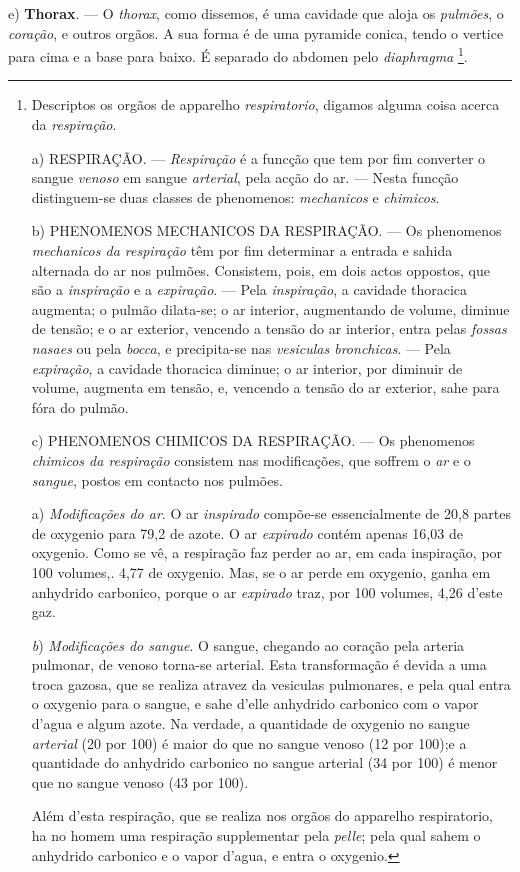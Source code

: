 e) \textbf{Thorax}. --- O \emph{thorax}, como dissemos, é uma cavidade que aloja os \emph{pulmões}, o \emph{coração}, e outros orgãos. A sua forma é de uma pyramide conica, tendo o vertice para cima e a base para baixo. É separado do abdomen pelo \emph{diaphragma} \footnote{Descriptos os orgãos de apparelho \emph{respiratorio}, digamos alguma coisa acerca da \emph{respiração}.\par a) \textsc{RESPIRAÇÃO}. --- \emph{Respiração} é a funcção que tem por fim converter o sangue \emph{venoso} em sangue \emph{arterial}, pela acção do ar. --- Nesta funcção distinguem-se duas classes de phenomenos: \emph{mechanicos} e \emph{chimicos}.\par b) PHENOMENOS MECHANICOS DA RESPIRAÇÃO. --- Os phenomenos \emph{mechanicos da respiração} têm por fim determinar a entrada e sahida alternada do ar nos pulmões. Consistem, pois, em dois actos oppostos, que são a \emph{inspiração} e a \emph{expiração}. --- Pela \emph{inspiração}, a cavidade thoracica augmenta; o pulmão dilata-se; o ar interior, augmentando de volume, diminue de tensão; e o ar exterior, vencendo a tensão do ar interior, entra pelas \emph{fossas nasaes} ou pela \emph{bocca}, e precipita-se nas \emph{vesiculas bronchicas}. --- Pela \emph{expiração}, a cavidade thoracica diminue; o ar interior, por diminuir de volume, augmenta em tensão, e, vencendo a tensão do ar exterior, sahe para fóra do pulmão.\par c) PHENOMENOS CHIMICOS DA RESPIRAÇÃO. --- Os phenomenos \emph{chimicos da respiração} consistem nas modificações, que soffrem o \emph{ar} e o \emph{sangue}, postos em contacto nos pulmões.\par a) \emph{Modificações do ar}. O ar \emph{inspirado} compõe-se essencialmente de 20,8 partes de oxygenio para 79,2 de azote. O ar \emph{expirado} contém apenas 16,03 de oxygenio. Como se vê, a respiração faz perder ao ar, em cada inspiração, por 100 volumes,. 4,77 de oxygenio. Mas, se o ar perde em oxygenio, ganha em anhydrido carbonico, porque o ar \emph{expirado} traz, por 100 volumes, 4,26 d'este gaz.\par \emph{b}) \emph{Modificações do sangue}. O sangue, chegando ao coração pela arteria pulmonar, de venoso torna-se arterial. Esta transformação é devida a uma troca gazosa, que se realiza atravez da vesiculas pulmonares, e pela qual entra o oxygenio para o sangue, e sahe d'elle anhydrido carbonico com o vapor d'agua e algum azote. Na verdade, a quantidade de oxygenio no sangue \emph{arterial} (20 por 100) é maior do que no sangue venoso (12 por 100);e a quantidade do anhydrido carbonico no sangue arterial (34 por 100) é menor que no sangue venoso (43 por 100).\par Além d'esta respiração, que se realiza nos orgãos do apparelho respiratorio, ha no homem uma respiração supplementar pela \emph{pelle}; pela qual sahem o anhydrido carbonico e o vapor d'agua, e entra o oxygenio.}.

